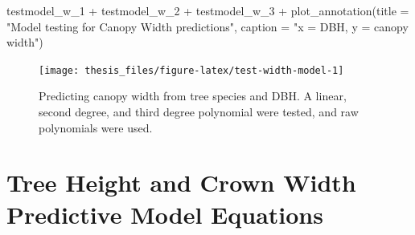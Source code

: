 \documentclass[12pt,twoside]{reedthesis}
\newenvironment{Shaded}{\begin{snugshade}}{\end{snugshade}}
\newcommand{\AttributeTok}[1]{\textcolor[rgb]{0.77,0.63,0.00}{#1}}
\newcommand{\FunctionTok}[1]{\textcolor[rgb]{0.00,0.00,0.00}{#1}}
\newcommand{\NormalTok}[1]{#1}
\newcommand{\SpecialCharTok}[1]{\textcolor[rgb]{0.00,0.00,0.00}{#1}}
\newcommand{\StringTok}[1]{\textcolor[rgb]{0.31,0.60,0.02}{#1}}
\begin{document}
\begin{Shaded}
\begin{Highlighting}[]
\NormalTok{testmodel\_w\_1 }\SpecialCharTok{+}\NormalTok{ testmodel\_w\_2 }\SpecialCharTok{+}\NormalTok{ testmodel\_w\_3 }\SpecialCharTok{+} \FunctionTok{plot\_annotation}\NormalTok{(}\AttributeTok{title =} \StringTok{"Model testing for Canopy Width predictions"}\NormalTok{,}
    \AttributeTok{caption =} \StringTok{"x = DBH, y = canopy width"}\NormalTok{)}
\end{Highlighting}
\end{Shaded}
\begin{figure}

{\centering \texttt{[image: thesis\_files/figure-latex/test-width-model-1]} 

}

\caption[Model tests for tree canopy width predictions]{Predicting canopy width from tree species and DBH. A linear, second degree, and third degree polynomial were tested, and raw polynomials were used.}\label{fig:test-width-model}
\end{figure}
\hypertarget{tree-model-eqs}{%
\section{Tree Height and Crown Width Predictive Model Equations}\label{tree-model-eqs}}
\end{document}
